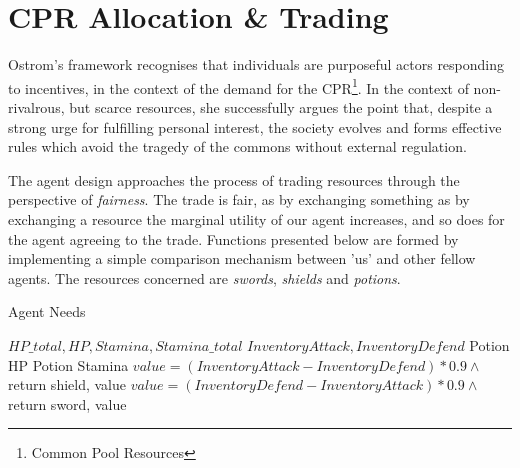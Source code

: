 


\section{CPR Allocation \& Trading}

Ostrom's framework recognises that individuals are purposeful actors responding to incentives, in the context of the demand for the CPR\footnote{Common Pool Resources}. In the context of non-rivalrous, but scarce resources, she successfully argues the point that, despite a strong urge for fulfilling personal interest, the society evolves and forms effective rules which avoid the tragedy of the commons without external regulation.

The agent design approaches the process of trading resources through the perspective of \textit{fairness}. The trade is fair, as by exchanging something as by exchanging a resource the marginal utility of our agent increases, and so does for the agent agreeing to the trade. Functions presented below are formed by implementing a simple comparison mechanism between 'us' and other fellow agents. The resources concerned are \textit{swords}, \textit{shields} and \textit{potions}.

\begin{algorithm}[htb]
\caption{Agent Needs}\label{alg:agentneeds}
\begin{algorithmic} 
\scriptsize
\Require $HP\_total, HP, Stamina, Stamina\_total$
\Require $InventoryAttack,InventoryDefend $
\State Potion HP
\EndIf
{}
\State Potion Stamina
\EndIf
{}
\State $value = (InventoryAttack - InventoryDefend)*0.9 \land$ return shield, value
\Else
\State $value = (InventoryDefend - InventoryAttack)*0.9 \land$ return sword, value
\EndIf
\end{algorithmic}
\end{algorithm}

